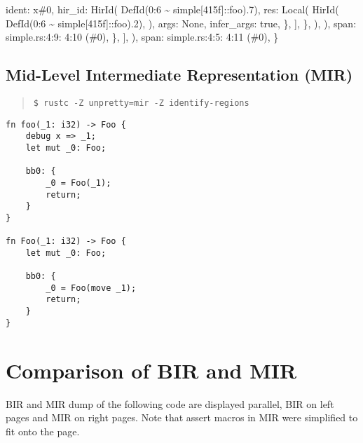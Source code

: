 \documentclass[
  11pt,
  twoside]{report}
\newenvironment{Shaded}{}{}
\newcommand{\NormalTok}[1]{#1}
\begin{document}
\begin{Shaded}
\begin{Highlighting}[]
\NormalTok{                                    ident: x\#0,}
\NormalTok{                                    hir\_id: HirId(}
\NormalTok{                                        DefId(0:6 \textasciitilde{} simple[415f]::foo).7),}
\NormalTok{                                    res: Local(}
\NormalTok{                                        HirId(}
\NormalTok{                                            DefId(0:6 \textasciitilde{} simple[415f]::foo).2),}
\NormalTok{                                    ),}
\NormalTok{                                    args: None,}
\NormalTok{                                    infer\_args: true,}
\NormalTok{                                \},}
\NormalTok{                            ],}
\NormalTok{                        \},}
\NormalTok{                    ),}
\NormalTok{                ),}
\NormalTok{                span: simple.rs:4:9: 4:10 (\#0),}
\NormalTok{            \},}
\NormalTok{        ],}
\NormalTok{    ),}
\NormalTok{    span: simple.rs:4:5: 4:11 (\#0),}
\NormalTok{\}}
\end{Highlighting}
\end{Shaded}

\section{Mid-Level Intermediate Representation
(MIR)}\label{sec:mid-level-intermediate-representation-mir}

\begin{quote}
\texttt{\$\ rustc\ -Z\ unpretty=mir\ -Z\ identify-regions}
\end{quote}

\begin{verbatim}
fn foo(_1: i32) -> Foo {
    debug x => _1;
    let mut _0: Foo;    

    bb0: {
        _0 = Foo(_1);
        return;
    }
}

fn Foo(_1: i32) -> Foo {
    let mut _0: Foo;    

    bb0: {
        _0 = Foo(move _1);
        return;
    }
}
\end{verbatim}

\cleardoublepage

\chapter{Comparison of BIR and MIR}\label{sec:comparison-of-bir-and-mir}

BIR and MIR dump of the following code are displayed parallel, BIR on
left pages and MIR on right pages. Note that assert macros in MIR were
simplified to fit onto the page.
\end{document}
